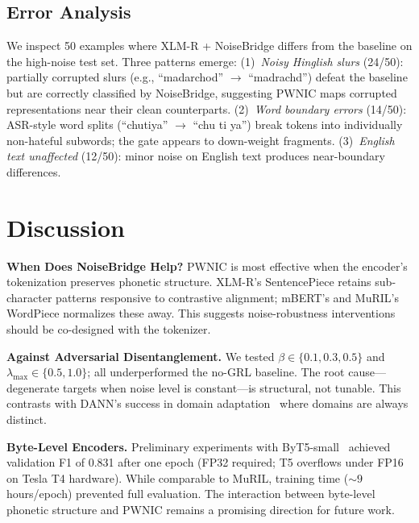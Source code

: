 \documentclass[conference]{IEEEtran}
\begin{document}
\subsection{Error Analysis}

We inspect 50 examples where XLM-R + NoiseBridge differs from the baseline on the high-noise test set. Three patterns emerge: (1)~\textit{Noisy Hinglish slurs} (24/50): partially corrupted slurs (e.g., ``madarchod'' $\to$ ``madrachd'') defeat the baseline but are correctly classified by NoiseBridge, suggesting PWNIC maps corrupted representations near their clean counterparts. (2)~\textit{Word boundary errors} (14/50): ASR-style word splits (``chutiya'' $\to$ ``chu ti ya'') break tokens into individually non-hateful subwords; the gate appears to down-weight fragments. (3)~\textit{English text unaffected} (12/50): minor noise on English text produces near-boundary differences.

\section{Discussion}
\label{sec:discussion}

\textbf{When Does NoiseBridge Help?} PWNIC is most effective when the encoder's tokenization preserves phonetic structure. XLM-R's SentencePiece retains sub-character patterns responsive to contrastive alignment; mBERT's and MuRIL's WordPiece normalizes these away. This suggests noise-robustness interventions should be co-designed with the tokenizer.

\textbf{Against Adversarial Disentanglement.} We tested $\beta \in \{0.1, 0.3, 0.5\}$ and $\lambda_\text{max} \in \{0.5, 1.0\}$; all underperformed the no-GRL baseline. The root cause---degenerate targets when noise level is constant---is structural, not tunable. This contrasts with DANN's success in domain adaptation~\cite{ganin2016domain} where domains are always distinct.

\textbf{Byte-Level Encoders.} Preliminary experiments with ByT5-small~\cite{xue2022byt5} achieved validation F1 of 0.831 after one epoch (FP32 required; T5 overflows under FP16 on Tesla T4 hardware). While comparable to MuRIL, training time (${\sim}9$ hours/epoch) prevented full evaluation. The interaction between byte-level phonetic structure and PWNIC remains a promising direction for future work.
\end{document}
